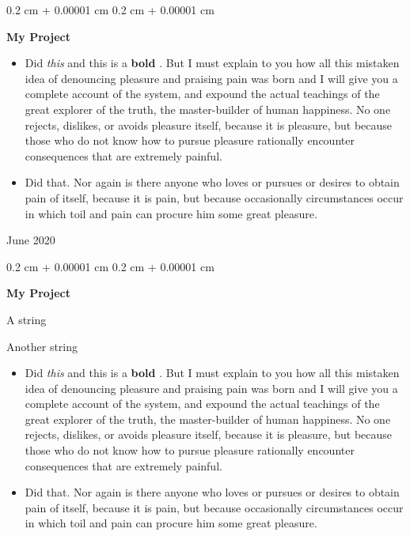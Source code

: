 \documentclass[10pt, letterpaper]{article}
\newenvironment{summary}{
    \begin{description}[
        topsep=0.10 cm,
        parsep=0.10 cm,
        partopsep=0pt,
        itemsep=0pt,
        leftmargin=0.4 cm + 10pt
    ]
}{
    \end{description}
} %
\newenvironment{highlights}{
    \begin{itemize}[
        topsep=0.10 cm,
        parsep=0.10 cm,
        partopsep=0pt,
        itemsep=0pt,
        leftmargin=0.4 cm + 10pt
    ]
}{
    \end{itemize}
} %
\newenvironment{onecolentry}{
    \begin{adjustwidth}{
        0.2 cm + 0.00001 cm
    }{
        0.2 cm + 0.00001 cm
    }
}{
    \end{adjustwidth}
} %
\newenvironment{twocolentry}[2][]{
    \onecolentry
    \def\secondColumn{#2}
    \setcolumnwidth{\fill, 4.5 cm}
    \begin{paracol}{2}
}{
    \switchcolumn \raggedleft \secondColumn
    \end{paracol}
    \endonecolentry
} %
\let\hrefWithoutArrow\href
\renewcommand{\href}[2]{\hrefWithoutArrow{#1}{\ifthenelse{\equal{#2}{}}{ }{#2 }\raisebox{.15ex}{\footnotesize \faExternalLink*}}}
\begin{document}
        \vspace{0.2 cm}

        \begin{twocolentry}{
            June 2020
        }
            \textbf{My Project}
            \begin{highlights}
                \item Did \textit{this} and this is a \textbf{bold} \href{https://example.com}{link}. But I must explain to you how all this mistaken idea of denouncing pleasure and praising pain was born and I will give you a complete account of the system, and expound the actual teachings of the great explorer of the truth, the master-builder of human happiness. No one rejects, dislikes, or avoids pleasure itself, because it is pleasure, but because those who do not know how to pursue pleasure rationally encounter consequences that are extremely painful.
                \item Did that. Nor again is there anyone who loves or pursues or desires to obtain pain of itself, because it is pain, but because occasionally circumstances occur in which toil and pain can procure him some great pleasure.
            \end{highlights}
        \end{twocolentry}


        \vspace{0.2 cm}

        \begin{onecolentry}
            \textbf{My Project}
            \begin{summary}
                \item A string
                \item Another string
            \end{summary}
            \begin{highlights}
                \item Did \textit{this} and this is a \textbf{bold} \href{https://example.com}{link}. But I must explain to you how all this mistaken idea of denouncing pleasure and praising pain was born and I will give you a complete account of the system, and expound the actual teachings of the great explorer of the truth, the master-builder of human happiness. No one rejects, dislikes, or avoids pleasure itself, because it is pleasure, but because those who do not know how to pursue pleasure rationally encounter consequences that are extremely painful.
                \item Did that. Nor again is there anyone who loves or pursues or desires to obtain pain of itself, because it is pain, but because occasionally circumstances occur in which toil and pain can procure him some great pleasure.
            \end{highlights}
        \end{onecolentry}
\end{document}
